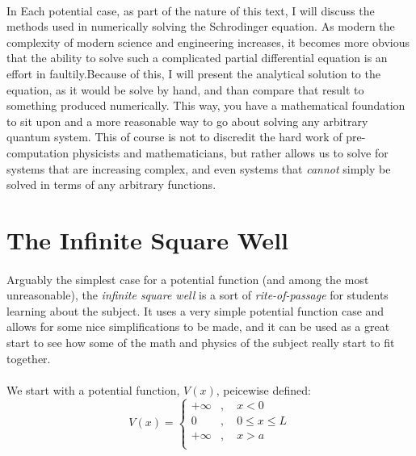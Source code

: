 \documentclass[12pt,letterpaper]{book}
\begin{document}
\paragraph*{}In Each potential case, as part of the nature of this text, I will discuss the methods used in numerically solving the Schrodinger equation. As modern the complexity of modern science and engineering increases, it becomes more obvious that the ability to solve such a complicated partial differential equation is an effort in faultily.Because of this, I will present the analytical solution to the equation, as it would be solve by hand, and than compare that result to something produced numerically. This way, you have a mathematical foundation to sit upon and a more reasonable way to go about solving any arbitrary quantum system. This of course is not to discredit the hard work of pre-computation physicists and mathematicians, but rather allows us to solve for systems that are increasing complex, and even systems that \textit{cannot} simply be solved in terms of any arbitrary functions.


\section{The Infinite Square Well}

\paragraph*{}Arguably the simplest case for a potential function (and among the most unreasonable), the \textit{infinite square well} is a sort of \textit{rite-of-passage} for students learning about the subject. It uses a very simple potential function case and allows for some nice simplifications to be made, and it can be used as a great start to see how some of the math and physics of the subject really start to fit together.
\paragraph*{}We start with a potential function, $V(x)$, peicewise defined:
\begin{equation}
\label{ISW potential}
V(x) = \left\{
        \begin{array}{ll}
            +\infty &, \quad x < 0 \\
            0 		&, \quad 0 \leq x \leq L \\
            +\infty &, \quad x > a \\
        \end{array}
    \right.
\end{equation}
\end{document}
